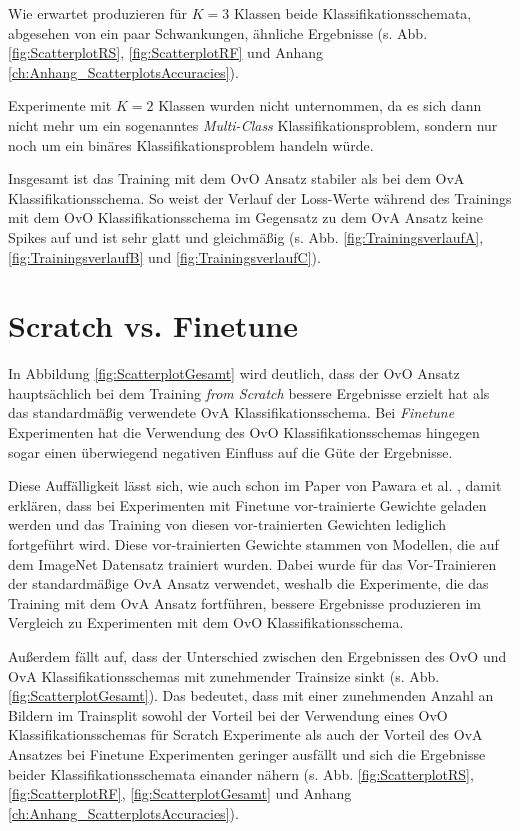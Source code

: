 Wie erwartet produzieren für $K=3$ Klassen beide Klassifikationsschemata, abgesehen von ein paar Schwankungen, ähnliche Ergebnisse (s. Abb. \ref{fig:ScatterplotRS}, \ref{fig:ScatterplotRF} und Anhang \ref{ch:Anhang_ScatterplotsAccuracies}).

\newpage

Experimente mit $K=2$ Klassen wurden nicht unternommen, da es sich dann nicht mehr um ein sogenanntes \textit{Multi-Class} Klassifikationsproblem, sondern nur noch um ein binäres Klassifikationsproblem handeln würde.

Insgesamt ist das Training mit dem OvO Ansatz stabiler als bei dem OvA Klassifikationsschema. So weist der Verlauf der Loss-Werte während des Trainings mit dem OvO Klassifikationsschema im Gegensatz zu dem OvA Ansatz keine Spikes auf und ist sehr glatt und gleichmäßig (s. Abb. \ref{fig:TrainingsverlaufA}, \ref{fig:TrainingsverlaufB} und \ref{fig:TrainingsverlaufC}).

\section{Scratch vs. Finetune}
\label{ch:diskussionSvsF}
In Abbildung \ref{fig:ScatterplotGesamt} wird deutlich, dass der OvO Ansatz hauptsächlich bei dem Training \textit{from Scratch} bessere Ergebnisse erzielt hat als das standardmäßig verwendete OvA Klassifikationsschema. Bei \textit{Finetune} Experimenten hat die Verwendung des OvO Klassifikationsschemas hingegen sogar einen überwiegend negativen Einfluss auf die Güte der Ergebnisse.

Diese Auffälligkeit lässt sich, wie auch schon im Paper von Pawara et al. \cite{pawaraPaper}, damit erklären, dass bei Experimenten mit Finetune vor-trainierte Gewichte geladen werden und das Training von diesen vor-trainierten Gewichten lediglich fortgeführt wird. Diese vor-trainierten Gewichte stammen von Modellen, die auf dem ImageNet \cite{imagenet} Datensatz trainiert wurden. Dabei wurde für das Vor-Trainieren der standardmäßige OvA Ansatz verwendet, weshalb die Experimente, die das Training mit dem OvA Ansatz fortführen, bessere Ergebnisse produzieren im Vergleich zu Experimenten mit dem OvO Klassifikationsschema.


Außerdem fällt auf, dass der Unterschied zwischen den Ergebnissen des OvO und OvA Klassifikationsschemas mit zunehmender Trainsize sinkt (s. Abb. \ref{fig:ScatterplotGesamt}). Das bedeutet, dass mit einer zunehmenden Anzahl an Bildern im Trainsplit sowohl der Vorteil bei der Verwendung eines OvO Klassifikationsschemas für Scratch Experimente als auch der Vorteil des OvA Ansatzes bei Finetune Experimenten geringer ausfällt und sich die Ergebnisse beider Klassifikationsschemata einander nähern (s. Abb. \ref{fig:ScatterplotRS}, \ref{fig:ScatterplotRF}, \ref{fig:ScatterplotGesamt} und Anhang \ref{ch:Anhang_ScatterplotsAccuracies}).



